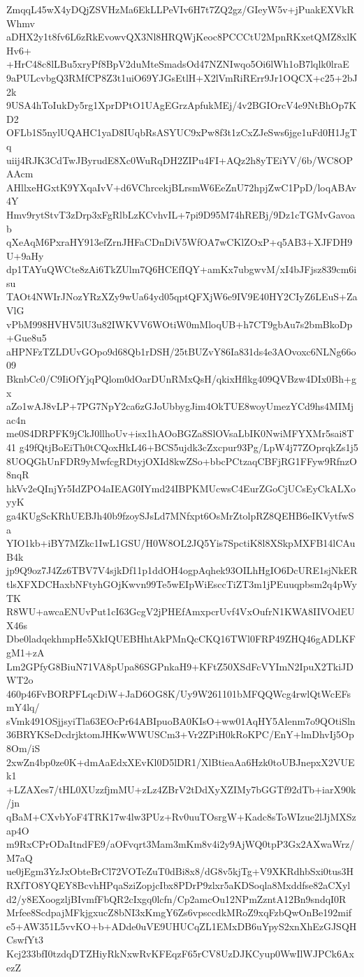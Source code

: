 ZmqqL45wX4yDQjZSVHzMa6EkLLPeVIv6H7t7ZQ2gz/GIeyW5v+jPuakEXVkRWhmv
aDHX2y1t8fv6L6zRkEvowvQX3Nl8HRQWjKeoc8PCCCtU2MpnRKxetQMZ8xlKHv6+
+HrC48c8lLBu5xryPf8BpV2duMteSmadsOd47NZNIwqo5Oi6lWh1oB7lqlk0lraE
9aPULcvbgQ3RMfCP8Z3t1uiO69YJGsEtlH+X2lVmRiRErr9Jr1OQCX+c25+2bJ2k
9USA4hToIukDy5rg1XprDPtO1UAgEGrzApfukMEj/4v2BGIOrcV4e9NtBhOp7KD2
OFLb1S5nylUQAHC1yaD8IUqbRsASYUC9xPw8f3t1zCxZJeSws6jge1uFd0H1JgTq
uiij4RJK3CdTwJByrudE8Xc0WuRqDH2ZIPu4FI+AQz2h8yTEiYV/6b/WC8OPAAcm
AHllxeHGxtK9YXqaIvV+d6VChrcekjBLrsmW6EeZnU72hpjZwC1PpD/loqABAv4Y
Hmv9rytStvT3zDrp3xFgRlbLzKCvhvIL+7pi9D95M74hREBj/9Dz1cTGMvGavoab
qXeAqM6PxraHY913efZrnJHFaCDnDiV5WfOA7wCKlZOxP+q5AB3+XJFDH9U+9aHy
dp1TAYuQWCte8zAi6TkZUlm7Q6HCEfIQY+amKx7ubgwvM/xI4bJFjsz839cm6isu
TAOt4NWIrJNozYRzXZy9wUa64yd05qptQFXjW6e9IV9E40HY2CIyZ6LEuS+ZaVlG
vPbM998HVHV5lU3u82IWKVV6WOtiW0mMloqUB+h7CT9gbAu7s2bmBkoDp+Gue8u5
aHPNFzTZLDUvGOpo9d68Qb1rDSH/25tBUZvY86Ia831ds4e3AOvoxc6NLNg66o09
BknbCc0/C9IiOfYjqPQlom0dOarDUnRMxQsH/qkixHflkg409QVBzw4DIx0Bh+gx
aZo1wAJ8vLP+7PG7NpY2ca6zGJoUbbygJim4OkTUE8woyUmezYCd9hs4MIMjac4n
me0S4DRPFK9jCkJ0llhoUv+isx1hAOoBGZa8SlOVsaLbIK0NwiMFYXMr5sai8T41
g49fQtjBoEiTh0tCQoxHkL46+BCS5ujdk3cZxcpur93Pg/LpW4j77ZOprqkZs1j5
8UOQGhUnFDR9yMwfcgRDtyjOXId8kwZSo+bbcPCtzaqCBFjRG1FFyw9RfnzO8nqR
hkVv2eQInjYr5IdZPO4aIEAG0IYmd24IBPKMUcwsC4EurZGoCjUCsEyCkALXoyyK
ga4KUgScKRhUEBJh40b9fzoySJsLd7MNfxpt6OsMrZtolpRZ8QEHB6eIKVytfwSa
YIO1kb+iBY7MZkc1IwL1GSU/H0W8OL2JQ5Yis7SpctiK8l8XSkpMXFB14lCAuB4k
jp9Q9oz7J4Zz6TBV7V4sjkDf11p1ddOH4ogpAqhek93OILhHgIO6DcURE1sjNkER
tlsXFXDCHaxbNFtyhGOjKwvn99Te5wEIpWiEsccTiZT3m1jPEuuqpbsm2q4pWyTK
R8WU+awcaENUvPut1cI63GcgV2jPHEfAmxpcrUvf4VxOufrN1KWA8IIVOdEUX46s
Dbe0ladqekhmpHe5XkIQUEBHhtAkPMnQcCKQ16TWl0FRP49ZHQ46gADLKFgM1+zA
Lm2GPfyG8BiuN71VA8pUpa86SGPnkaH9+KFtZ50XSdFcVYImN2IpuX2TkiJDWT2o
460p46FvBORPFLqcDiW+JaD6OG8K/Uy9W261101bMFQQWcg4rwlQtWcEFsmY4lq/
sVmk491OSjjsyiTla63EOcPr64ABIpuoBA0KIsO+ww01AqHY5Alenm7o9QOtiSln
36BRYKSeDcdrjktomJHKwWWUSCm3+Vr2ZPiH0kRoKPC/EnY+lmDhvIj5Op8Om/iS
2xwZn4bp0ze0K+dmAaEdxXEvKl0D5lDR1/XlBtieaAa6Hzk0toUBJnepxX2VUEk1
+LZAXes7/tHL0XUzzfjmMU+zLz4ZBrV2tDdXyXZIMy7bGGTf92dTb+iarX90k/jn
qBaM+CXvbYoF4TRK17w4lw3PUz+Rv0uuTOsrgW+Kadc8sToWIzue2lJjMXSzap4O
m9RxCPrODaItndFE9/aOFvqrt3Mam3mKm8v4i2y9AjWQ0tpP3Gx2AXwaWrz/M7aQ
ue0jEgm3YzJxObteBrCl72VOTeZuT0dBi8x8/dG8v5kjTg+V9XKRdhbSxi0tus3H
RXfTO8YQEY8BcvhHPqaSziZopjcIbx8PDrP9zlxr5aKDSoqla8Mxddfse82aCXyl
d2/y8EXoogzljBIvmfFbQR2cIxgq0lcfn/Cp2amcOu12NPmZzntA12Bn9sndqI0R
Mrfee8ScdpajMFkjgxucZ8bNI3xKmgY6Zs6vpsccdkMRoZ9xqFzbQwOnBe192mif
e5+AW351L5vvKO+b+ADde0uVE9UHUCqZL1EMxDB6uYpyS2xnXhEzGJSQHCswfYt3
Kcj233bfI0tzdqDTZHiyRkNxwRvKFEqzF65rCV8UzDJKCyup0WwIlWJPCk6AxezZ
